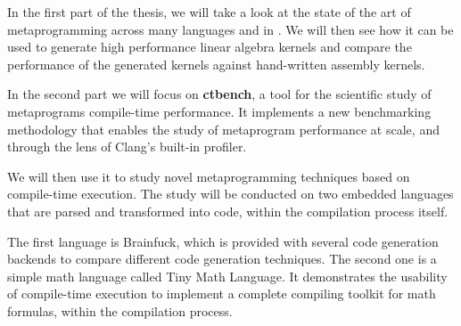 \documentclass[main]{subfiles}
\begin{document}

In the first part of the thesis, we will take a look at the state of the art of
metaprogramming across many languages and in \cpp.
We will then see how it can be used to generate high performance linear algebra
kernels and compare the performance of the generated kernels against
hand-written assembly kernels.

In the second part we will focus on \textbf{ctbench}, a tool for the scientific
study of \cpp metaprograms compile-time performance. It implements a new
benchmarking methodology that enables the study of metaprogram performance
at scale, and through the lens of Clang's built-in profiler.

We will then use it to study novel \cpp metaprogramming techniques based on
compile-time \cpp execution. The study will be conducted on two embedded
languages that are parsed and transformed into \cpp code, within the \cpp
compilation process itself.

The first language is Brainfuck, which is provided with several code generation
backends to compare different code generation techniques. The second one
is a simple math language called Tiny Math Language. It demonstrates
the usability of compile-time \cpp execution to implement a complete compiling
toolkit for math formulas, within the \cpp compilation process.
\end{document}
